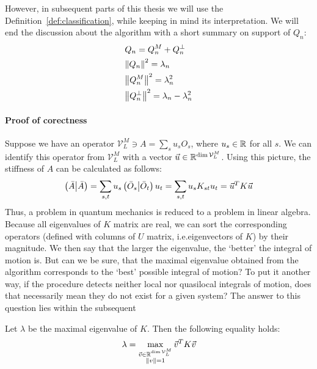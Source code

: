 However, in subsequent parts of this thesis we will use the Definition~\ref{def:classification}, while
keeping in mind its interpretation. We will end the discussion about the algorithm with 
a short summary on support of \(Q_n\):
\begin{align}
  & Q_n = Q_n^M + Q_n^{\perp}\nonumber\\
  & \norm{Q_n}^2 = \lambda_n \nonumber\\
  & \norm{Q_n^M}^2 = \lambda_n^2 \nonumber\\
  & \norm{Q_n^{\perp}}^2 = \lambda_n - \lambda_n^2
  \label{eq:summary of support}
\end{align}

\paragraph{Proof of corectness}
Suppose we have an operator \(\mathcal{V}_L^M \ni A = \sum_s u_s O_s \), where \(u_s \in \mathbb{R} \) for all \(s\).
We can identify this operator from \(\mathcal{V}_L^M\) with a vector \( \vec{u} \in \mathbb{R}^{\dim{\mathcal{V}_L^M}}\). Using this picture,
the stiffness of \(A\) can be calculated as follows:
\begin{equation}
  \left(\bar{A} \middle| \bar{A}\right) = \sum_{s,t} u_s \left(\bar{O}_s \middle| \bar{O}_t\right) u_t = \sum_{s,t} u_s K_{st} u_t = 
   \vec{u}^{T} K \vec{u}  
\end{equation} 
Thus, a problem in quantum mechanics is reduced to a problem in linear algebra.
Because all eigenvalues of \(K\) matrix are real, we can sort the corresponding operators (defined with columns of \(U\) matrix,
i.e.\;eigenvectors of \(K\)) by their magnitude. We then say that the larger the eigenvalue, the `better' the integral of motion is.
But can we be sure, that the maximal eigenvalue obtained from the algorithm corresponds to the `best' possible integral of motion?
To put it another way, if the procedure detects neither local nor quasilocal integrals of motion, does that necessarily mean they
do not exist for a given system? The answer to this question lies within the subsequent
\begin{proposition}
Let \(\lambda \) be the maximal eigenvalue of \(K\). Then the following equality holds:
\begin{equation*}
  \lambda = \max_{  \substack{\vec{v}\in \mathbb{R}^{\dim{\mathcal{V}_L^M}}\\\norm{v} = 1}  }{\vec{v}^{T} K \vec{v}}
\end{equation*}
\end{proposition}
